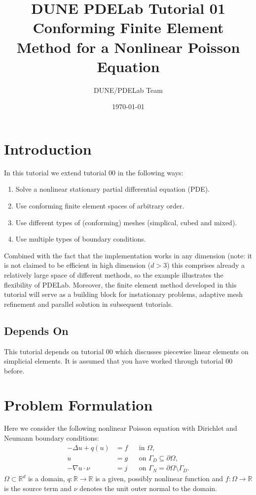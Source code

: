 \documentclass[a4paper,12pt]{article}
\title{DUNE PDELab Tutorial 01 \\
Conforming Finite Element Method for a Nonlinear Poisson Equation}
\author{DUNE/PDELab Team}
\date{\today}
\begin{document}
\maketitle
\tableofcontents
\clearpage

\section{Introduction}

In this tutorial we extend tutorial 00 in the following ways:
\begin{enumerate}[1)]
\item Solve a nonlinear stationary partial differential equation (PDE).
\item Use conforming finite element spaces of arbitrary order.
\item Use different types of (conforming) meshes (simplical, cubed and mixed).
\item Use multiple types of boundary conditions.
\end{enumerate}
Combined with the fact that the implementation works in any dimension
(note: it is not claimed to be efficient in high dimension ($d>3$) this comprises
already a relatively large space of different methods, so the example illustrates
the flexibility of PDELab. Moreover, the
finite element method developed in this tutorial will serve as a
building block for instationary problems, adaptive mesh refinement and
parallel solution in subsequent tutorials.

\subsection*{Depends On}

This tutorial depends on tutorial 00 which discusses piecewise linear elements on simplicial
elements. It is assumed that you have worked through tutorial 00 before.

\section{Problem Formulation}

Here we consider the following nonlinear Poisson equation with
Dirichlet and Neumann boundary conditions:
\begin{subequations} \label{eq:ProblemStrong}
\begin{align}
-\Delta u + q(u) &= f &&\text{in $\Omega$},\\
u &= g &&\text{on $\Gamma_D\subseteq\partial\Omega$},\\
-\nabla u\cdot \nu &= j &&\text{on $\Gamma_N=\partial\Omega\setminus\Gamma_D$}.
\end{align}
\end{subequations}
$\Omega\subset\mathbb{R}^d$ is a domain, $q:\mathbb{R}\to\mathbb{R}$ is a given, possibly
nonlinear function and $f: \Omega\to\mathbb{R}$ is the source term and
$\nu$ denotes the unit outer normal to the domain.
\end{document}
